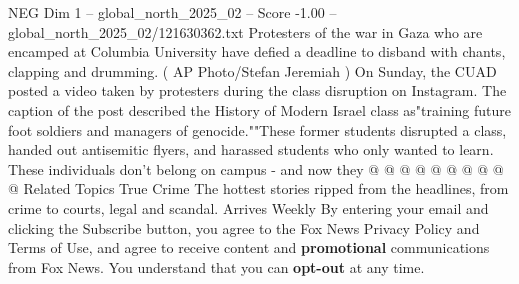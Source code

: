 \begin{textsample}{NEG Dim 1 – global\_north\_2025\_02 – Score -1.00 – global\_north\_2025\_02/121630362.txt}
Protesters of the war in Gaza who are encamped at Columbia University have defied a deadline to disband with chants, clapping and drumming. ( AP Photo/Stefan Jeremiah ) On Sunday, the CUAD posted a video taken by protesters during the class disruption on Instagram.
The caption of the post described the History of Modern Israel class as"training future foot soldiers and managers of genocide.""These former students disrupted a class, handed out antisemitic flyers, and harassed students who only wanted to learn.
These individuals don't belong on campus - and now they @ @ @ @ @ @ @ @ @ @ Related Topics True Crime The hottest stories ripped from the headlines, from crime to courts, legal and scandal.
Arrives Weekly By entering your email and clicking the Subscribe button, you agree to the Fox News Privacy Policy and Terms of Use, and agree to receive content and \textbf{promotional} communications from Fox News.
You understand that you can \textbf{opt-out} at any time.

\end{textsample}
